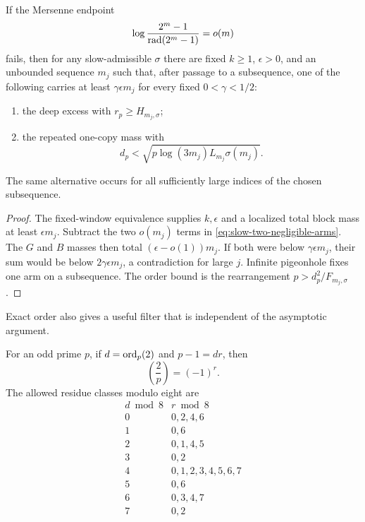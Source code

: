 \begin{theorem}
\label{thm:mersenne-critical-two-arm}
If the Mersenne endpoint
\[
        \log\frac{2^m-1}{\operatorname{rad}(2^m-1)}=o(m)
\]
fails, then for any slow-admissible $\sigma$ there are fixed $k\ge1$,
$\epsilon>0$, and an unbounded sequence $m_j$ such that, after passage to a
subsequence, one of the following carries at least
$\gamma\epsilon m_j$ for every fixed $0<\gamma<1/2$:
\begin{enumerate}
\item the deep excess with $r_p\ge H_{m_j,\sigma}$;
\item the repeated one-copy mass with
\[
 d_p<\sqrt{p\log(3m_j)L_{m_j}\sigma(m_j)}.
\]
\end{enumerate}
The same alternative occurs for all sufficiently large indices of the chosen
subsequence.
\end{theorem}

\begin{proof}
The fixed-window equivalence supplies $k,\epsilon$ and a localized total
block mass at least $\epsilon m_j$.  Subtract the two $o(m_j)$ terms in
\eqref{eq:slow-two-negligible-arms}.  The $G$ and $B$ masses then total
$(\epsilon-o(1))m_j$.  If both were below $\gamma\epsilon m_j$, their sum
would be below $2\gamma\epsilon m_j$, a contradiction for large $j$.
Infinite pigeonhole fixes one arm on a subsequence.  The order bound is the
rearrangement $p>d_p^2/F_{m_j,\sigma}$.
\end{proof}

Exact order also gives a useful filter that is independent of the asymptotic
argument.

\begin{proposition}
\label{prop:mersenne-euler-multiplier-character}
For an odd prime $p$, if $d=\operatorname{ord}_p(2)$ and $p-1=dr$, then
\[
                         \left(\frac2p\right)=(-1)^r.
\]
The allowed residue classes modulo eight are
\[
\begin{array}{c|c}
d\bmod8&r\bmod8\\ \hline
0&0,2,4,6\\
1&0,6\\
2&0,1,4,5\\
3&0,2\\
4&0,1,2,3,4,5,6,7\\
5&0,6\\
6&0,3,4,7\\
7&0,2
\end{array}
\]
\end{proposition}

